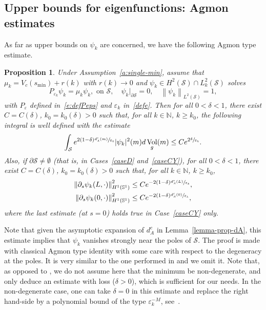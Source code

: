 \documentclass[10pt]{amsart}
\newtheorem{proposition}[lemma]{Proposition}
\theoremstyle{definition}
\newcommand{\calS}{\ensuremath{\mathcal S}}
\newcommand{\mb}[1]{\ensuremath{\mathbb{#1}}}
\newcommand{\N}{{\mb{N}}}
\newcommand{\bS}{\ensuremath{\mathbb S}}
\DeclareMathOperator{\Vol}{Vol}
\newcommand\nor[2]{\left\|#1\right\|_{#2}}
\newcommand{\ce}{c}
\let\d\partial
\let\e\varepsilon
\let\eps\varepsilon
\begin{document}
\subsection{Upper bounds for eigenfunctions: Agmon estimates}
\label{s:surf-Agmon}
As far as upper bounds on $\psi_k$ are concerned, we have the following Agmon type estimate.
\begin{proposition}
\label{p:Agmon-revolution}
Under Assumption~\ref{a:single-min}, assume that $\mu_k = V_\ce(s_{\min}) +r(k)$ with $r(k)\to 0$ and $\psi_k \in H^2 (\mathcal{S})\cap L^2_k(\calS)$ solves
\[
P_{\e_k}\psi_k=\mu_k \psi_k, \text{ on } \calS, \quad \psi_k|_{\d\calS} = 0,\quad \nor{\psi_k}{L^2(\calS)}=1,
\]
with $P_\eps$ defined in~\eqref{e:defPeps} and $\e_k$ in~\eqref{defe}. Then for all $0<\delta< 1$, there exist $C=C(\delta)$, $k_0=k_0(\delta)>0$ such that, for all $k \in \N$, $k \geq k_0$, the following integral is well defined with the estimate
\[
\int_{\calS} e^{2(1-\delta)\sfrac{ d_A^{\ce}(m)}{\e_k}} |\psi_k|^2(m) d\Vol_g(m)
\leq C e^{2\sfrac{\delta}{\e_k}}.
\]
Also, if $\d\calS \neq \emptyset$ (that is, in Cases~\ref{caseD} and~\ref{caseCY}), for all $0<\delta< 1$, there exist $C=C(\delta)$, $k_0=k_0(\delta)>0$ such that, for all $k \in \N$, $k \geq k_0$,
\begin{equation}
\label{e:estimate-psik-bord}
\begin{split}
\nor{\d_s \psi_k(L,\cdot)}{H^1(\bS^1)}^2
&\leq C e^{- 2(1-\delta)\sfrac{ d_A^{\ce}(L)}{\e_k}}, \\
\nor{\d_s \psi_k(0,\cdot)}{H^1(\bS^1)}^2
&\leq C e^{- 2(1-\delta)\sfrac{ d_A^{\ce}(0)}{\e_k}},
\end{split}
\end{equation}
where the last estimate (at $s=0$) holds true in Case~\ref{caseCY} only.
\end{proposition}
Note that given the asymptotic expansion of $d_A^{\ce}$ in Lemma~\ref{lemma-prop-dA}, this estimate implies that $\psi_k$ vanishes strongly near the poles of $\calS$.
The proof is made with classical Agmon type identity with some care with respect to the degeneracy at the poles. It is very similar to the one performed in \cite[Th.\,3.9]{LL:18} and we omit it. Note that, as opposed to \cite[Th.\,3.9]{LL:18}, we do not assume here that the minimum be non-degenerate, and only deduce an estimate with loss ($\delta>0$), which is sufficient for our needs. In the non-degenerate case, one can take $\delta=0$ in this estimate and replace the right hand-side by a polynomial bound of the type $\e_k^{-M}$, see~\cite[Th.\,3.9]{LL:18}.
\end{document}
